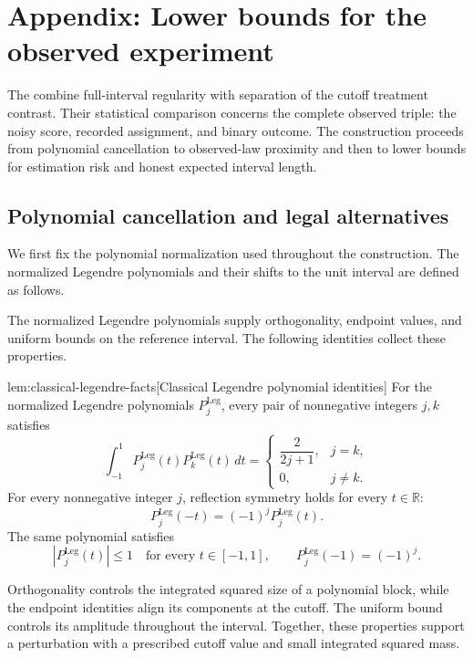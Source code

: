 \section{Appendix: Lower bounds for the observed experiment}

The  combine full-interval regularity with separation of the cutoff treatment contrast. Their statistical comparison concerns the complete observed triple: the noisy score, recorded assignment, and binary outcome. The construction proceeds from polynomial cancellation to observed-law proximity and then to lower bounds for estimation risk and honest expected interval length.

\subsection{Polynomial cancellation and legal alternatives}

We first fix the polynomial normalization used throughout the construction. The normalized Legendre polynomials  and their shifts to the unit interval are defined as follows.



The normalized Legendre polynomials  supply orthogonality, endpoint values, and uniform bounds on the reference interval. The following identities collect these properties.

\begin{theoremv}{lem:classical-legendre-facts}[Classical Legendre polynomial identities]
For the normalized Legendre polynomials \(P_j^{\mathrm{Leg}}\), every pair of nonnegative integers \(j,k\) satisfies
\[
\int_{-1}^{1} P_j^{\mathrm{Leg}}(t)P_k^{\mathrm{Leg}}(t)\,dt
=
\begin{cases}
\dfrac{2}{2j+1}, & j=k,\\
0, & j\ne k.
\end{cases}
\]
For every nonnegative integer \(j\), reflection symmetry holds for every \(t\in\mathbb R\):
\[
P_j^{\mathrm{Leg}}(-t)=(-1)^jP_j^{\mathrm{Leg}}(t).
\]
The same polynomial satisfies
\[
|P_j^{\mathrm{Leg}}(t)|\le 1
\quad\text{for every }t\in[-1,1],
\qquad
P_j^{\mathrm{Leg}}(-1)=(-1)^j.
\]
\end{theoremv}

Orthogonality controls the integrated squared size of a polynomial block, while the endpoint identities align its components at the cutoff. The uniform bound controls its amplitude throughout the interval. Together, these properties support a perturbation with a prescribed cutoff value and small integrated squared mass.

